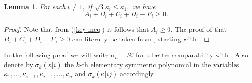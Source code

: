 \documentclass{amsart}
\newtheorem{lemma}[theorem]{Lemma}
\theoremstyle{definition}
\theoremstyle{remark}
\numberwithin{equation}{section}
\begin{document}
\begin{lemma}\label{app2}
For each $i\ne 1,$ if $\sqrt{3}\kappa_i\leq \kappa_1,$ we have
\[A_i+B_i+C_i+D_i-E_i\geq 0.\]
\end{lemma}
\begin{proof}
Note that from (\ref{key ineq}) it follows that $A_i\geq 0.$ The proof of that $B_i+C_i+D_i-E_i\geq 0$ can literally be taken from \cite[Lemma 4.2]{Guan}, starting with \cite[equ.~(4.10)]{Guan}.
\end{proof}

In the following proof we will write $\sigma_n=\mathcal{K}$ for a better comparability with \cite[Lemma~4.3]{Guan}. Also denote by $\sigma_k(\kappa|i)$ the $k$-th elementary symmetric polynomial in the variables $\kappa_1,\dots,\kappa_{i-1},\kappa_{i+1},\dots,\kappa_n$ and $\sigma_k(\kappa|ij)$ accordingly.
\end{document}

